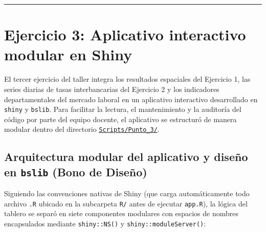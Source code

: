 \documentclass[
  10pt,
  letterpaper,
  DIV=11,
  numbers=noendperiod]{scrartcl}
\begin{document}
\begin{center}\rule{0.5\linewidth}{0.5pt}\end{center}

\section{Ejercicio 3: Aplicativo interactivo modular en
Shiny}\label{ejercicio-3-aplicativo-interactivo-modular-en-shiny}

El tercer ejercicio del taller integra los resultados espaciales del
Ejercicio 1, las series diarias de tasas interbancarias del Ejercicio 2
y los indicadores departamentales del mercado laboral en un aplicativo
interactivo desarrollado en \texttt{shiny} y \texttt{bslib}. Para
facilitar la lectura, el mantenimiento y la auditoría del código por
parte del equipo docente, el aplicativo se estructuró de manera modular
dentro del directorio
\href{https://github.com/MPalma21/Talleres_de_R/tree/main/Entregable_Talleres/Taller_3/Scripts/Punto_3}{\texttt{Scripts/Punto\_3/}}.

\subsection{\texorpdfstring{Arquitectura modular del aplicativo y diseño
en \texttt{bslib} (Bono de
Diseño)}{Arquitectura modular del aplicativo y diseño en bslib (Bono de Diseño)}}\label{arquitectura-modular-del-aplicativo-y-diseuxf1o-en-bslib-bono-de-diseuxf1o}

Siguiendo las convenciones nativas de Shiny (que carga automáticamente
todo archivo \texttt{.R} ubicado en la subcarpeta \texttt{R/} antes de
ejecutar \texttt{app.R}), la lógica del tablero se separó en siete
componentes modulares con espacios de nombres encapsulados mediante
\texttt{shiny::NS()} y \texttt{shiny::moduleServer()}:
\end{document}
